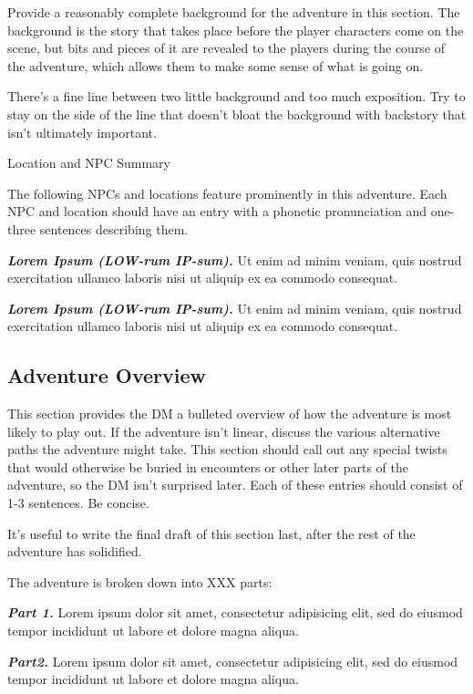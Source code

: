 Provide a reasonably complete background for the adventure in this
section. The background is the story that takes place before the player
characters come on the scene, but bits and pieces of it are revealed to
the players during the course of the adventure, which allows them to
make some sense of what is going on.

There's a fine line between two little background and too much
exposition. Try to stay on the side of the line that doesn't bloat the
background with backstory that isn't ultimately important.

Location and NPC Summary

The following NPCs and locations feature prominently in this adventure.
Each NPC and location should have an entry with a phonetic pronunciation
and one-three sentences describing them.

\emph{\textbf{Lorem Ipsum (LOW-rum IP-sum).}} Ut enim ad minim veniam,
quis nostrud exercitation ullamco laboris nisi ut aliquip ex ea commodo
consequat.

\emph{\textbf{Lorem Ipsum (LOW-rum IP-sum).}} Ut enim ad minim veniam,
quis nostrud exercitation ullamco laboris nisi ut aliquip ex ea commodo
consequat.

\subsection{Adventure Overview}\label{adventure-overview}

This section provides the DM a bulleted overview of how the adventure is
most likely to play out. If the adventure isn't linear, discuss the
various alternative paths the adventure might take. This section should
call out any special twists that would otherwise be buried in encounters
or other later parts of the adventure, so the DM isn't surprised later.
Each of these entries should consist of 1-3 sentences. Be concise.

It's useful to write the final draft of this section last, after the
rest of the adventure has solidified.

The adventure is broken down into XXX parts:

\emph{\textbf{Part 1.}} Lorem ipsum dolor sit amet, consectetur
adipisicing elit, sed do eiusmod tempor incididunt ut labore et dolore
magna aliqua.

\emph{\textbf{Part2.}} Lorem ipsum dolor sit amet, consectetur
adipisicing elit, sed do eiusmod tempor incididunt ut labore et dolore
magna aliqua.

